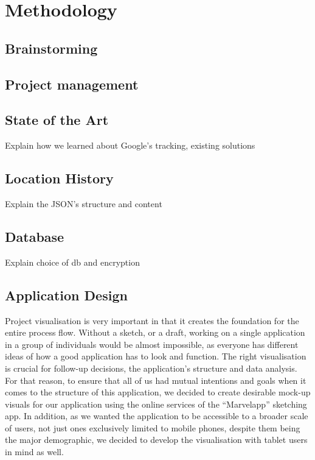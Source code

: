 \documentclass[12p]{article}
\begin{document}
		
		
		\newpage
		\section{Methodology} \label{Methodology}
		
		    \subsection{Brainstorming}
		
    		\subsection{Project management}
    		
    		\subsection{State of the Art}
    		Explain how we learned about Google's tracking, existing solutions
    		
    		\subsection{Location History}
    		Explain the JSON's structure and content
    		
    		\subsection{Database}
    		Explain choice of db and encryption
    		
    		\subsection{Application Design}
    		Project visualisation is very important in that it creates the foundation for the entire process flow. Without a sketch, or a draft, working on a single application in a group of individuals would be almost impossible, as everyone has different ideas of how a good application has to look and function. The right visualisation is crucial for follow-up decisions, the application’s structure and data analysis. For that reason, to ensure that all of us had mutual intentions and goals when it comes to the structure of this application, we decided to create desirable mock-up visuals for our application using the online services of the “Marvelapp” sketching app. In addition, as we wanted the application to be accessible to a broader scale of users, not just ones exclusively limited to mobile phones, despite them being the major demographic, we decided to develop the visualisation with tablet users in mind as well.
    		
\end{document}
